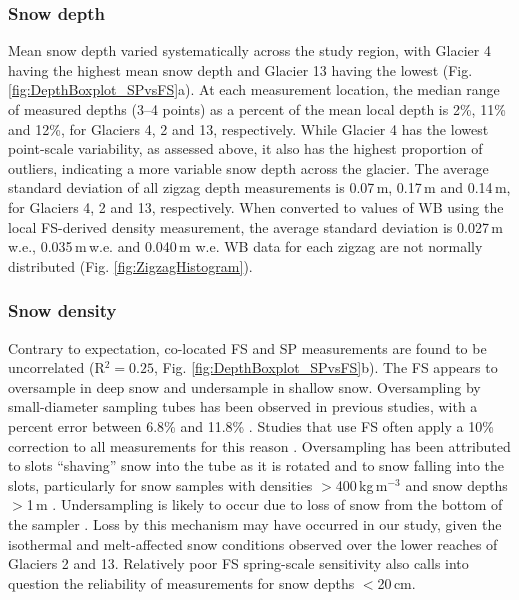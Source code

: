 \documentclass[twocolumn, letterpaper]{igs}
\begin{document}
\subsubsection{Snow depth}
Mean snow depth varied systematically across the study region, with Glacier 4 having the highest mean snow depth and Glacier 13 having the lowest (Fig. \ref{fig:DepthBoxplot_SPvsFS}a). At each measurement location, the median range of measured depths (3--4 points) as a percent of the mean local depth is 2\%, 11\% and 12\%, for Glaciers 4, 2 and 13, respectively. While Glacier 4 has the lowest point-scale variability, as assessed above, it also has the highest proportion of outliers, indicating a more variable snow depth across the glacier. The average standard deviation of all zigzag depth measurements is 0.07\,m, 0.17\,m and 0.14\,m, for Glaciers 4, 2 and 13, respectively. When converted to values of WB using the local FS-derived density measurement, the average standard deviation is 0.027\,m\,w.e., 0.035\,m\,w.e. and 0.040\,m w.e. WB data for each zigzag are not normally distributed (Fig. \ref{fig:ZigzagHistogram}).

\subsubsection{Snow density}

Contrary to expectation, co-located FS and SP measurements are found to be uncorrelated (R$^2=0.25$, Fig. \ref{fig:DepthBoxplot_SPvsFS}b). The FS appears to oversample in deep snow and undersample in shallow snow. Oversampling by small-diameter sampling tubes has been observed in previous studies, with a percent error between 6.8\% and 11.8\% \citep[e.g.][]{Work1965, Fames1982, Conger2009}. Studies that use FS often apply a 10\% correction to all measurements for this reason \citep[e.g.][]{Molotch2005}. Oversampling has been attributed to slots ``shaving'' snow into the tube as it is rotated \citep[e.g.][]{Dixon2012} and to snow falling into the slots, particularly for snow samples with densities $>$400\,kg\,m$^{-3}$ and snow depths $>$1\,m \citep[e.g.][]{Beaumont1963}. Undersampling is likely to occur due to loss of snow from the bottom of the sampler \citep{Turcan1975}. Loss by this mechanism may have occurred in our study, given the isothermal and melt-affected snow conditions observed over the lower reaches of Glaciers 2 and 13. Relatively poor FS spring-scale sensitivity also calls into question the reliability of measurements for snow depths $<$20\,cm.
\end{document}
